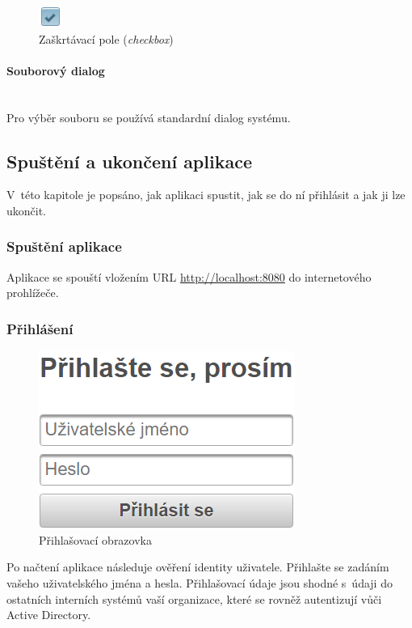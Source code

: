 \documentclass[thesis=M,czech]{FITthesis}[2019/12/23]
\newcommand{\lbparagraph}[1]{\paragraph{#1}\mbox{}\\} %
\begin{document}
\begin{figure}[H]
  \centering
  \includegraphics[scale=0.5]{res/guide/CheckBox.png}
  \caption{Zaškrtávací pole (\textit{checkbox})}
  \label{fig:Zaškrtávací pole (checkbox)}
\end{figure}

\lbparagraph{Souborový dialog}

Pro výběr souboru se používá standardní dialog systému.

\newpage
\subsection{Spuštění a ukončení aplikace}
V~této kapitole je popsáno, jak aplikaci spustit, jak se do ní přihlásit a jak ji lze ukončit.

\subsubsection{Spuštění aplikace}
Aplikace se spouští vložením URL \url{http://localhost:8080} do internetového prohlížeče.

\subsubsection{Přihlášení}
\begin{figure}[H]
  \centering
  \includegraphics[scale=0.75]{res/guide/Login.png}
  \caption{Přihlašovací obrazovka}
  \label{fig:Přihlašovací obrazovka}
\end{figure}

Po načtení aplikace následuje ověření identity uživatele. Přihlašte se zadáním vašeho uživatelského jména a hesla. Přihlašovací údaje jsou shodné s~údaji do ostatních interních systémů vaší organizace, které se rovněž autentizují vůči Active Directory.
\end{document}
